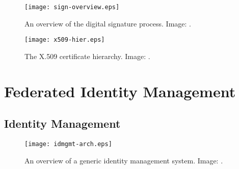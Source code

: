 \documentclass{beamer}
\begin{document}
\begin{frame}{\insertsubsectionhead}
  \begin{figure}
    \texttt{[image: sign-overview.eps]}
    \caption{An overview of the digital signature process.
      Image: \cite{Stallings2013nse}.
    }
  \end{figure}
\end{frame}

\begin{frame}{\insertsubsectionhead}
  \begin{figure}
    \texttt{[image: x509-hier.eps]}
    \caption{The X.509 certificate hierarchy.
      Image: \cite{Stallings2013nse}.
    }
  \end{figure}
\end{frame}

%
%
%
%
%
%

\section{Federated Identity Management}

\subsection{Identity Management}

\begin{frame}{\insertsubsectionhead}
  \begin{figure}
    \texttt{[image: idmgmt-arch.eps]}
    \caption{An overview of a generic identity management system.
      Image: \cite{Stallings2013nse}.
    }
  \end{figure}
\end{frame}
\end{document}
